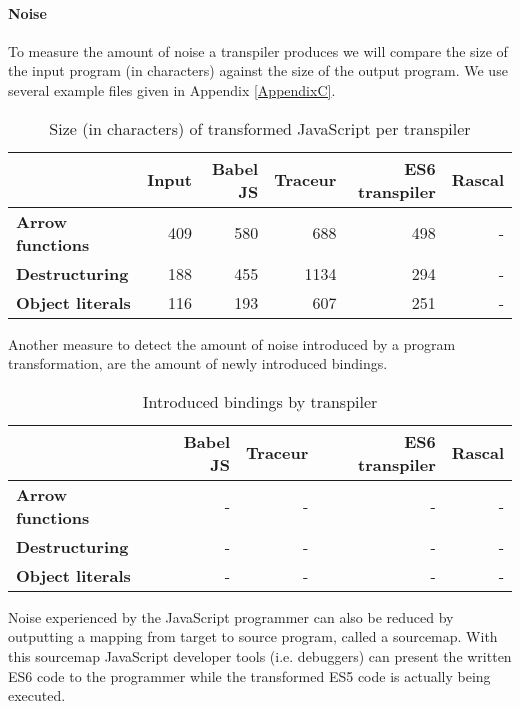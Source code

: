 \paragraph{Noise}
To measure the amount of noise a transpiler produces we will compare the size of the input program (in characters) against the size of the output program. We use several example files given in Appendix \ref{AppendixC}.

\begin{table}
\caption{Size (in characters) of transformed JavaScript per transpiler} \label{tab:noise1}
\begin{tabular}{@{}lrrrrr@{}}
\toprule
{}                         & \textbf{Input} & \textbf{Babel JS} & \textbf{Traceur} & \textbf{ES6 transpiler} & \textbf{Rascal} \\ \midrule
\textbf{Arrow functions}   & 409            & 580               & 688              & 498 & - \\
\textbf{Destructuring}     & 188            & 455               & 1134             & 294 & - \\ 
\textbf{Object literals}   & 116            & 193               & 607              & 251 & - \\    
\bottomrule
\end{tabular}
\end{table}

Another measure to detect the amount of noise introduced by a program transformation, are the amount of newly introduced bindings.

\begin{table}
\caption{Introduced bindings by transpiler} \label{tab:noise2}
\begin{tabular}{@{}lrrrr@{}}
\toprule
{}                         & \textbf{Babel JS} & \textbf{Traceur} & \textbf{ES6 transpiler} & \textbf{Rascal} \\ \midrule
\textbf{Arrow functions}   & -               & -              & - & - \\
\textbf{Destructuring}     & -               & -             & - & - \\ 
\textbf{Object literals}   & -               & -              & - & - \\    
\bottomrule
\end{tabular}
\end{table}

Noise experienced by the JavaScript programmer can also be reduced by outputting a mapping from target to source program, called a sourcemap. With this sourcemap JavaScript developer tools (i.e. debuggers) can present the written ES6 code to the programmer while the transformed ES5 code is actually being executed.

